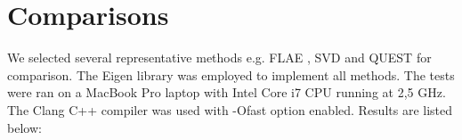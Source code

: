 \documentclass{birkjour}
\numberwithin{equation}{section}
\begin{document}
\section{Comparisons}

We selected several representative methods e.g. FLAE \cite{Wu2017}, SVD \cite{Arun1987} and QUEST \cite{Shuster1981} for comparison. The Eigen library \cite{Eigen} was employed to implement all methods. The tests were ran on a MacBook Pro laptop with Intel Core i7 CPU running at 2,5 GHz. The Clang C++ compiler was used with -Ofast option enabled. Results are listed below: %

\end{document}

